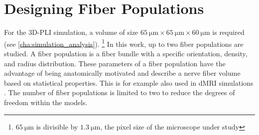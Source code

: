 \section{Designing Fiber Populations}
%
For the \ac{3D-PLI} simulation, a volume of size $\SI{65}{\micro\meter} \times \SI{65}{\micro\meter} \times \SI{60}{\micro\meter}$ is required (see \cref{cha:simulation_analysis}). \footnote{$\SI{65}{\micro\meter}$ is divisible by $\SI{1.3}{\micro\meter}$, the pixel size of the microscope under study}
In this work, up to two fiber populations are studied.
A fiber population is a fiber bundle with a specific orientation, density, and radius distribution.
These parameters of a fiber population have the advantage of being anatomically motivated and describe a nerve fiber volume based on statistical properties.
This is for example also used in \ac{dMRI} simulations \cite{Ginsburger2018,Ginsburger2019,ginsburgerDis2019}.
The number of fiber populations is limited to two to reduce the degrees of freedom within the models.
%
% 
% 
